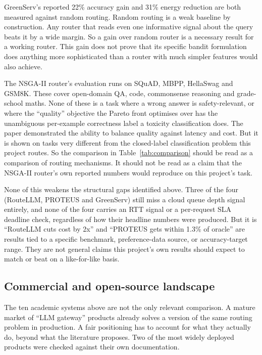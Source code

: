 GreenServ's reported 22\% accuracy gain and 31\% energy reduction are
both measured against random routing. Random routing is a weak baseline by
construction. Any router that reads even one informative signal about
the query beats it by a wide margin. So a gain over random router is a
necessary result for a working router. This gain does not prove that its
specific bandit formulation does anything more sophisticated than a router
with much simpler features would also achieve.

The NSGA-II router's evaluation runs on SQuAD, MBPP, HellaSwag and
GSM8K. These cover open-domain QA, code, commonsense reasoning and
grade-school maths. None of these is a task where a wrong answer is
safety-relevant, or where the ``quality'' objective the Pareto front
optimises over has the unambiguous per-example correctness label a
toxicity classification does. The paper demonstrated the ability to
balance quality against latency and cost. But it is shown on
tasks very different from the closed-label classification problem this
project routes. So the comparison in Table~\ref{tab:comparison} should
be read as a comparison of routing mechanisms. It should not be read as
a claim that the NSGA-II router's own reported numbers would reproduce
on this project's task.

None of this weakens the structural gaps identified above. Three of the
four (RouteLLM, PROTEUS and GreenServ) still miss a cloud queue depth
signal entirely, and none of the four carries an RTT signal or a
per-request SLA deadline check, regardless of how their headline
numbers were produced. But it is ``RouteLLM cuts cost by 2x'' 
and ``PROTEUS gets within 1.3\% of oracle'' 
are results tied to a specific benchmark, preference-data source, or 
accuracy-target range. They are not general claims this project's own
results should expect to match or beat on a like-for-like basis.

\hypertarget{commercial-and-open-source-landscape}{%
\subsection{Commercial and open-source
landscape}\label{commercial-and-open-source-landscape}}

The ten academic systems above are not the only relevant comparison. A
mature market of ``LLM gateway'' products already solves a version of the
same routing problem in production. A fair positioning has to account
for what they actually do, beyond what the literature proposes. Two
of the most widely deployed products were checked against their own
documentation.

